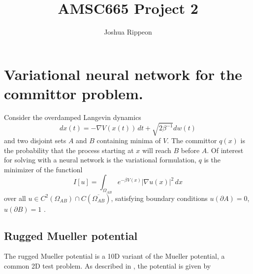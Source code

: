 \documentclass[12pt]{article}
\title{AMSC665 Project 2}
\author{Joshua Rippeon}
\newcommand{\abs}[1]{\left\vert #1 \right\vert}
\newcommand{\closure}[1]{\overline{#1}}
\newcommand{\bdy}{\partial} %
\theoremstyle{ColorTheorem}
\numberwithin{theorem}{section}
\numberwithin{corollary}{section}
\theoremstyle{ColorDefinition}
\theoremstyle{definition}
\theoremstyle{ColorRemark}
\numberwithin{equation}{section}
\begin{document}
\maketitle


\tableofcontents
\section{Variational neural network for the committor problem.}

Consider the overdamped Langevin dynamics
\begin{equation}\label{eq:overdamped_langevin}
  dx(t) = - \nabla V(x(t)) \, dt + \sqrt{2 \beta^{-1}} dw(t)
\end{equation}
and two disjoint sets \(A\) and \(B\) containing minima of \(V\).
The committor \(q(x)\) is the probability that the process starting at \(x\)
will reach \(B\) before \(A\).
Of interest for solving with a neural network is the variational formulation,
\(q\) is the minimizer of the functionl
\begin{equation}\label{eq:committor_functional}
  I[u] = \int_{\Omega_{AB}} e^{-\beta V(x)} \abs{\nabla u(x)}^2 \, dx
\end{equation}
over all \(u \in C^2(\Omega_{AB}) \cap C(\closure{\Omega_{AB}})\),
satisfying boundary conditions \(u(\bdy A) = 0\), \(u(\bdy B) = 1\) \cite{face_nn_deltanet}.

\subsection{Rugged Mueller potential}
The rugged Mueller potential is a 10D variant of the Mueller potential, a common 2D test problem.
As described in \cite{yuan2024}, the potential is given by
\end{document}
